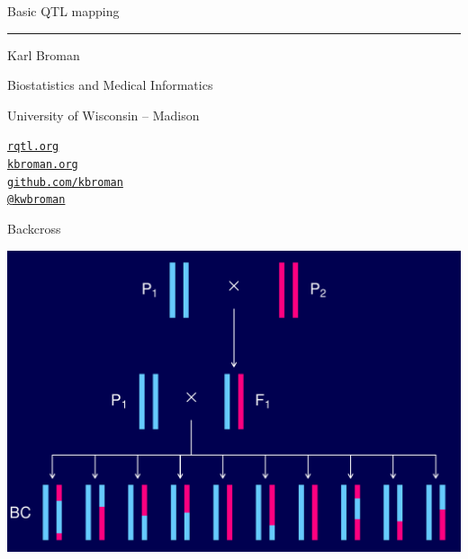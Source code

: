 \documentclass[12pt]{article}
\newcommand{\titlesize}{\fontsize{40}{50} \selectfont}
\newcommand{\headsize}{\fontsize{35}{35} \selectfont}
\newcommand{\textsize}{\fontsize{30}{35} \selectfont}
\newcommand{\smallsize}{\fontsize{25}{30} \selectfont}
\begin{document}
\thispagestyle{empty}

\begin{center}
\titlesize \color{myyellow}


\vspace*{15mm}

Basic QTL mapping

\color{mypink}
\rule{10in}{1mm}

\vspace{5mm}

\textsize \color{myblue}
Karl Broman
\vspace{5mm}

\color{mywhite}
{\smallsize Biostatistics and Medical Informatics

University of Wisconsin -- Madison
\vspace{20mm}


\href{http://rqtl.org}{\tt rqtl.org} \\[3pt]
\href{https://kbroman.org}{\tt kbroman.org} \\[3pt]
\href{https://github.com/kbroman}{\tt github.com/kbroman} \\
\href{https://twitter.com/kwbroman}{\tt @kwbroman}
}

\end{center}

\newpage

\headsize \color{myyellow}
\hfill \begin{minipage}{5.75in}
\centering
Backcross
\end{minipage}

\vfill

\centerline{\includegraphics{Figs/backcross.pdf}}

\newpage
\end{document}
